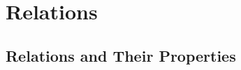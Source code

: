\documentclass[../discrete.tex]{subfiles}
\begin{document}
\chapter{Relations}
\section{Relations and Their Properties}
\end{document}
